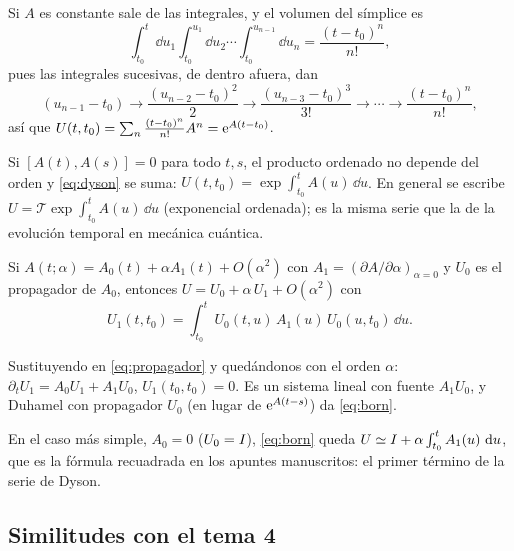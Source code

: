 \documentclass[11pt,twoside]{article}
\begin{document}
\begin{corolario}
Si $A$ es constante sale de las integrales, y el volumen del símplice es
\begin{equation*}
\int_{t_0}^{t}\!\dd u_1\int_{t_0}^{u_1}\!\dd u_2\cdots\int_{t_0}^{u_{n-1}}\!\dd u_n=\frac{(t-t_0)^n}{n!},
\end{equation*}
pues las integrales sucesivas, de dentro afuera, dan
\begin{equation*}
(u_{n-1}-t_0)\to\frac{(u_{n-2}-t_0)^2}{2}\to\frac{(u_{n-3}-t_0)^3}{3!}\to\cdots\to\frac{(t-t_0)^n}{n!},
\end{equation*}
así que $U(t,t_0)=\sum_n\frac{(t-t_0)^n}{n!}A^n=\mathrm{e}^{A(t-t_0)}$.
\end{corolario}

\begin{observacion}
Si $[A(t),A(s)]=0$ para todo $t,s$, el producto ordenado no depende del orden y \eqref{eq:dyson} se suma:
$U(t,t_0)=\exp\int_{t_0}^tA(u)\,\dd u$. En general se escribe $U=\mathcal T\exp\int_{t_0}^{t}A(u)\,\dd u$
(exponencial ordenada); es la misma serie que la de la evolución temporal en mecánica cuántica.
\end{observacion}

\begin{proposicion}\label{prop:born}
Si $A(t;\alpha)=A_0(t)+\alpha A_1(t)+O(\alpha^2)$ con $A_1=(\partial A/\partial\alpha)_{\alpha=0}$ y $U_0$ es el propagador
de $A_0$, entonces $U=U_0+\alpha\,U_1+O(\alpha^2)$ con
\begin{equation}\label{eq:born}
U_1(t,t_0)=\int_{t_0}^{t}U_0(t,u)\,A_1(u)\,U_0(u,t_0)\,\dd u .
\end{equation}
\end{proposicion}

\begin{demostracion}
Sustituyendo en \eqref{eq:propagador} y quedándonos con el orden $\alpha$:
$\partial_tU_1=A_0U_1+A_1U_0$, $U_1(t_0,t_0)=0$. Es un sistema lineal con fuente $A_1U_0$, y Duhamel con propagador
$U_0$ (en lugar de $\mathrm{e}^{A(t-s)}$) da \eqref{eq:born}.
\end{demostracion}

En el caso más simple, $A_0=0$ ($U_0=I$), \eqref{eq:born} queda $U\simeq I+\alpha\int_{t_0}^t A_1(u)\,\mathop{}\!\mathrm{d} u$, que es la
fórmula recuadrada en los apuntes manuscritos: el primer término de la serie de Dyson.

\subsection{Similitudes con el tema 4}
\end{document}
